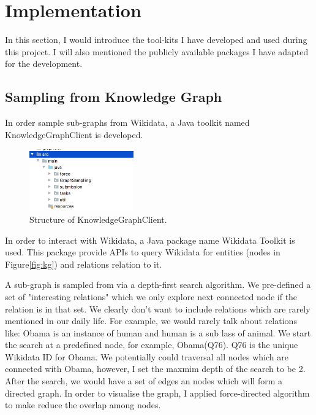 \documentclass[bsc,frontabs,twoside,singlespacing,parskip,deptreport]{infthesis}     %
\begin{document}
\newpage





\section{Implementation}

In this section, I would introduce the tool-kits I have developed and used during this project. I will also mentioned the publicly available packages I have adapted for the development.

\subsection{Sampling from Knowledge Graph}

In order sample sub-graphs from Wikidata, a Java toolkit named KnowledgeGraphClient is developed.

\begin{figure}[h]
    \centering
    \includegraphics[width=0.4\textwidth]{client.png}
    \caption{Structure of KnowledgeGraphClient.}
    \label{fig:client}
\end{figure}

In order to interact with Wikidata, a Java package name Wikidata Toolkit\cite{wikitoolkit} is used. This package provide APIs to query Wikidata for entities (nodes in Figure\ref{fig:kg}) and relations relation to it.

A sub-graph is sampled from via a depth-first search algorithm. We pre-defined a set of "interesting relations" which we only explore next connected node if the relation is in that set. We clearly don't want to include relations which are rarely mentioned in our daily life. For example, we would rarely talk about relations like: Obama is an instance of human and human is a sub lass of animal. We start the search at a predefined node, for example, Obama(Q76). Q76 is the unique Wikidata ID for Obama. We potentially could traversal all nodes which are connected with Obama, however, I set the maxmim depth of the search to be 2. After the search, we would have a set of edges an nodes which will form a directed graph. In order to visualise the graph, I applied force-directed algorithm to make reduce the overlap among nodes.
\end{document}
